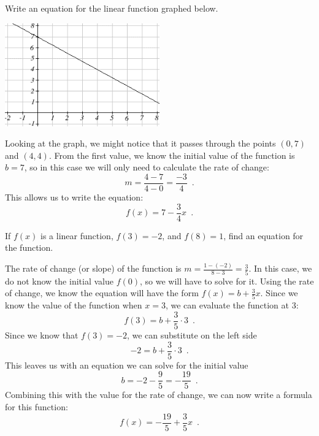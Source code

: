 \begin{example}

Write an equation for the linear function graphed below.
\begin{center}
\includegraphics[width=0.5\textwidth]{img/chap1/sec1-4/image048.png}
\end{center}

\begin{solution} Looking at the graph, we might notice that it passes through the points $(0, 7)$ and $(4, 4)$. From the first value, we know the initial value of the function is $b = 7$, so in this case we will only need to calculate the rate of change:
$$m = \frac{4-7}{4-0}=\frac{-3}{4} \enspace . $$
This allows us to write the equation:
$$f(x) = 7-\frac{3}{4} x \enspace .$$

\end{solution}\end{example}

\begin{example}
If $f(x)$ is a linear function, $f(3)=-2$, and $f(8) = 1$, find an equation for the function.

\begin{solution} The rate of change (or slope) of the function is $m = \frac{1-(-2)}{8-3} = \frac{3}{5}$. In this case, we do not know the initial value $f(0)$, so we will have to solve for it. Using the rate of change, we know the equation will have the form $f(x)=b+\frac{3}{5}x$. Since we know the value of the function when $x = 3$, we can evaluate the function at 3:
$$f(3)= b + \frac{3}{5}\cdot 3 \enspace.$$
Since we know that $f(3)=-2$, we can substitute on the left side
$$ -2 = b + \frac{3}{5}\cdot 3 \enspace.$$
This leaves us with an equation we can solve for the initial value
$$b = -2 - \frac{9}{5}= -\frac{19}{5} \enspace .$$
Combining this with the value for the rate of change, we can now write a formula for this function:
$$f(x)=-\frac{19}{5} + \frac{3}{5}x\enspace .$$
\end{solution}\end{example}

